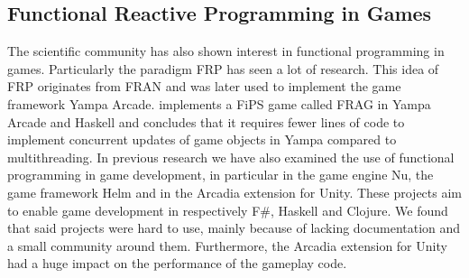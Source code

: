 \subsection{Functional Reactive Programming in Games}
The scientific community has also shown interest in functional programming in games. Particularly the paradigm \gls{FRP} has seen a lot of research. This idea of \gls{FRP} originates from FRAN\cite{ElliottHudak97:Fran} and was later used to implement the game framework Yampa Arcade\cite{courtney2003yampa}. \cite{cheong2005functional} implements a \gls{FiPS} game called FRAG in Yampa Arcade and Haskell and concludes that it requires fewer lines of code to implement concurrent updates of game objects in Yampa compared to multithreading. In previous research we have also examined the use of functional programming in game development\cite{p92018gameplay}, in particular in the game engine Nu, the game framework Helm and in the Arcadia extension for Unity. These projects aim to enable game development in respectively F\#, Haskell and Clojure. We found that said projects were hard to use, mainly because of lacking documentation and a small community around them. Furthermore, the Arcadia extension for Unity had a huge impact on the performance of the gameplay code\cite{p92018gameplay}.